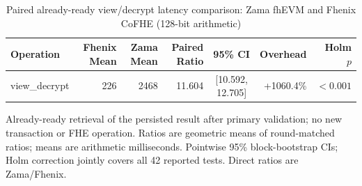 \begin{table}[!t]
\caption{Paired already-ready view/decrypt latency comparison: Zama fhEVM and Fhenix CoFHE (128-bit arithmetic)}
\label{tab:zama-fhenix-lifecycle-comparison-view-128}
\centering
\footnotesize
\setlength{\tabcolsep}{5pt}
\begin{tabular}{|l|r|r|r|c|r|r|}
\hline
\textbf{Operation} & \textbf{Fhenix Mean} & \textbf{Zama Mean} & \textbf{Paired Ratio} & \textbf{95\% CI} & \textbf{Overhead} & \textbf{Holm \(p\)} \\
\hline
view\_decrypt & 226 & 2468 & 11.604 & [10.592, 12.705] & +1060.4\% & $<0.001$ \\
\hline
\end{tabular}
\vspace{2pt}
\parbox{\textwidth}{\scriptsize Already-ready retrieval of the persisted result after primary validation; no new transaction or FHE operation. Ratios are geometric means of round-matched ratios; means are arithmetic milliseconds. Pointwise 95\% block-bootstrap CIs; Holm correction jointly covers all 42 reported tests. Direct ratios are Zama/Fhenix.}
\end{table}

